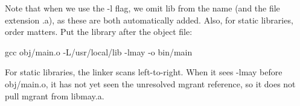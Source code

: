 \documentclass{report}
\begin{document}
\begin{itemize}
                \bigbreak \noindent 
                Note that when we use the -l flag, we omit lib from the name (and the file extension .a), as these are both automatically added.
                \bigbreak \noindent 
                Also, for static libraries, order matters. Put the library after the object file:
                \bigbreak \noindent 
                \begin{bashcode}
                gcc obj/main.o -L/usr/local/lib -lmay -o bin/main
                \end{bashcode}
                \bigbreak \noindent 
                For static libraries, the linker scans left-to-right. When it sees -lmay before obj/main.o, it has not yet seen the unresolved mgrant reference, so it does not pull mgrant from libmay.a.

        \end{itemize}
\end{document}

